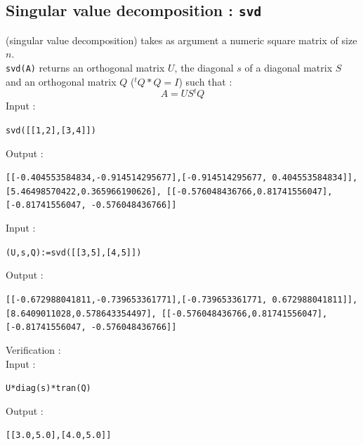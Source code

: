 \documentclass[a4paper,11pt]{book}
\begin{document}
\subsection{Singular value decomposition : {\tt svd}}
 (singular value decomposition) takes as argument a numeric
square matrix of size $n$.\\
{\tt svd(A)} returns an orthogonal matrix $U$, the diagonal $s$ of a diagonal
matrix $S$ and an orthogonal matrix $Q$ (${}^tQ*Q=I$) such that :
\[ A=U S{}^t Q \]
Input :
\begin{center}{\tt svd([[1,2],[3,4]])}\end{center}
Output :
\begin{center}{\tt [[-0.404553584834,-0.914514295677],[-0.914514295677, 0.404553584834]], [5.46498570422,0.365966190626], [[-0.576048436766,0.81741556047],[-0.81741556047, -0.576048436766]]}\end{center}
Input :
\begin{center}{\tt (U,s,Q):=svd([[3,5],[4,5]])}\end{center}
Output :
\begin{center}{\tt [[-0.672988041811,-0.739653361771],[-0.739653361771, 0.672988041811]],[8.6409011028,0.578643354497], [[-0.576048436766,0.81741556047],[-0.81741556047, -0.576048436766]]}\end{center}
Verification :\\
Input :
\begin{center}{\tt U*diag(s)*tran(Q)}\end{center}
Output :
\begin{center}{\tt [[3.0,5.0],[4.0,5.0]]}\end{center}
\end{document}
